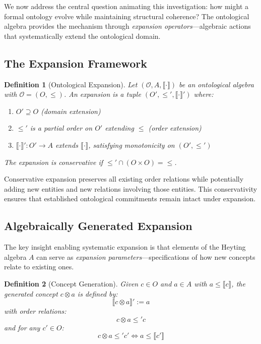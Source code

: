 \documentclass[12pt,a4paper]{article}
\newtheorem{definition}{Definition}[section]
\newcommand{\onto}{\mathcal{O}}
\newcommand{\sem}[1]{\llbracket #1 \rrbracket}
\begin{document}
We now address the central question animating this investigation: how might a formal ontology evolve while maintaining structural coherence? The ontological algebra provides the mechanism through \emph{expansion operators}---algebraic actions that systematically extend the ontological domain.

\subsection{The Expansion Framework}

\begin{definition}[Ontological Expansion]
Let $(\onto, A, \sem{\cdot})$ be an ontological algebra with $\onto = (O, \leq)$. An \emph{expansion} is a tuple $(O', \leq', \sem{\cdot}')$ where:
\begin{enumerate}
    \item $O' \supseteq O$ (domain extension)
    \item $\leq'$ is a partial order on $O'$ extending $\leq$ (order extension)
    \item $\sem{\cdot}' : O' \to A$ extends $\sem{\cdot}$, satisfying monotonicity on $(O', \leq')$
\end{enumerate}
The expansion is \emph{conservative} if $\leq' \cap (O \times O) = \leq$.
\end{definition}

Conservative expansion preserves all existing order relations while potentially adding new entities and new relations involving those entities. This conservativity ensures that established ontological commitments remain intact under expansion.

\subsection{Algebraically Generated Expansion}

The key insight enabling systematic expansion is that elements of the Heyting algebra $A$ can serve as \emph{expansion parameters}---specifications of how new concepts relate to existing ones.

\begin{definition}[Concept Generation]
Given $c \in O$ and $a \in A$ with $a \leq \sem{c}$, the \emph{generated concept} $c \otimes a$ is defined by:
$$
\sem{c \otimes a}' := a
$$
with order relations:
$$
c \otimes a \leq' c
$$
and for any $c' \in O$:
$$
c \otimes a \leq' c' \iff a \leq \sem{c'}
$$
\end{definition}
\end{document}
